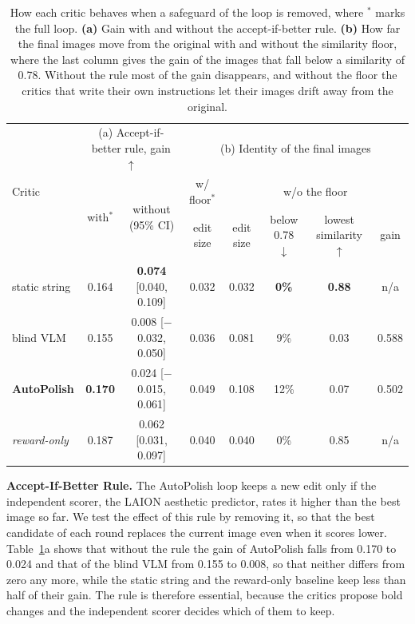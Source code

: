 \documentclass[runningheads]{llncs}
\begin{document}
\begin{table}[t]
  \caption{How each critic behaves when a safeguard of the loop is removed, where $^\ast$ marks the full loop. \textbf{(a)} Gain with and without the accept-if-better rule. \textbf{(b)} How far the final images move from the original with and without the similarity floor, where the last column gives the gain of the images that fall below a similarity of 0.78. Without the rule most of the gain disappears, and without the floor the critics that write their own instructions let their images drift away from the original.}
  \label{tab:abl-guard}
  \centering
  \fontsize{7.5}{9}\selectfont
  \setlength{\aboverulesep}{0pt}\setlength{\belowrulesep}{0pt}
  \renewcommand{\arraystretch}{1.1}
  \setlength{\tabcolsep}{2.4pt}
  \begin{tabular*}{\linewidth}{@{\extracolsep{\fill}}l|cc|c|cccc@{}}
    \toprule
    \multirow{3}{*}{Critic} & \multicolumn{2}{c|}{(a) Accept-if-better rule, gain $\uparrow$\rule{0pt}{2.4ex}} & \multicolumn{5}{c}{(b) Identity of the final images} \\
    \cline{2-8}
    & \multirow{2}{*}{with$^\ast$} & \multirow{2}{*}{without (95\% CI)} & w/ floor$^\ast$\rule{0pt}{2.3ex} & \multicolumn{4}{c}{w/o the floor} \\
    \cline{4-8}
    \rule[-0.8ex]{0pt}{0pt} & & & edit size\rule{0pt}{2.3ex} & edit size & below 0.78 $\downarrow$ & \shortstack{lowest\\similarity $\uparrow$} & gain \\
    \midrule
    static string\rule{0pt}{2.3ex} & 0.164 & \textbf{0.074} [0.040, 0.109] & 0.032 & 0.032 & \textbf{0\%} & \textbf{0.88} & n/a \\
    blind VLM & 0.155 & 0.008 [$-$0.032, 0.050] & 0.036 & 0.081 & 9\% & 0.03 & 0.588 \\
    \textbf{AutoPolish}\rule[-0.7ex]{0pt}{0pt} & \textbf{0.170} & 0.024 [$-$0.015, 0.061] & 0.049 & 0.108 & 12\% & 0.07 & 0.502 \\
    \midrule
    \textit{reward-only}\rule{0pt}{2.3ex}\rule[-0.7ex]{0pt}{0pt} & 0.187 & 0.062 [0.031, 0.097] & 0.040 & 0.040 & 0\% & 0.85 & n/a \\
    \bottomrule
  \end{tabular*}
\end{table}

\textbf{Accept-If-Better Rule.} The AutoPolish loop keeps a new edit only if the independent scorer, the LAION aesthetic predictor, rates it higher than the best image so far. We test the effect of this rule by removing it, so that the best candidate of each round replaces the current image even when it scores lower. Table~\ref{tab:abl-guard}a shows that without the rule the gain of AutoPolish falls from 0.170 to 0.024 and that of the blind VLM from 0.155 to 0.008, so that neither differs from zero any more, while the static string and the reward-only baseline keep less than half of their gain. The rule is therefore essential, because the critics propose bold changes and the independent scorer decides which of them to keep.
\end{document}
